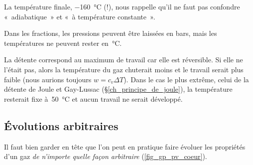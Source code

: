 \begin{anexample}
\begin{answer}
					\begin{remark}La température finale, \SI{-160}{\degreeCelsius} (!), nous rappelle qu’il ne faut pas confondre «~adiabatique~» et «~à température constante~».\end{remark}
					\begin{remark}Dans les fractions, les pressions peuvent être laissées en \si{bars}, mais les températures ne peuvent rester en~\si{\degreeCelsius}.\end{remark}
					\begin{remark}La détente correspond au maximum de travail car elle est réversible. Si elle ne l’était pas, alors la température du gaz chuterait moins et le travail serait plus faible (nous aurions toujours $w = c_v \Delta T$). Dans le cas le plus extrême, celui de la détente de Joule et Gay-Lussac (\S\ref{ch_principe_de_joule}), la température resterait fixe à~\SI{50}{\degreeCelsius} et aucun travail ne serait développé.\end{remark}
				\end{answer}
		\end{anexample}

		
	\subsection{Évolutions arbitraires}
	
		Il faut bien garder en tête que l’on peut en pratique faire évoluer les propriétés d’un gaz \emph{de n’importe quelle façon arbitraire} (\cref{fig_gp_pv_coeur}).
		
